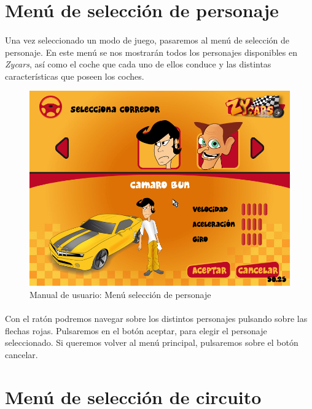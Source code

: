 \section{Menú de selección de personaje}

\paragraph{}
Una vez seleccionado un modo de juego, pasaremos al menú de selección de personaje. En este menú se nos mostrarán todos
los personajes disponibles en \emph{Zycars}, así como el coche que cada uno de ellos conduce y las distintas características
que poseen los coches.

\begin{figure}[H]
  \label{menu_personaje}
  \begin{center}
    \includegraphics[scale=0.4]{imagenes/capturas/seleccionpersonaje.png}
  \end{center}
  \caption{Manual de usuario: Menú selección de personaje}
\end{figure}

\paragraph{}
Con el ratón podremos navegar sobre los distintos personajes pulsando sobre las flechas rojas. Pulsaremos en el botón
aceptar, para elegir el personaje seleccionado. Si queremos volver al menú principal, pulsaremos sobre el botón cancelar.

\section{Menú de selección de circuito}

